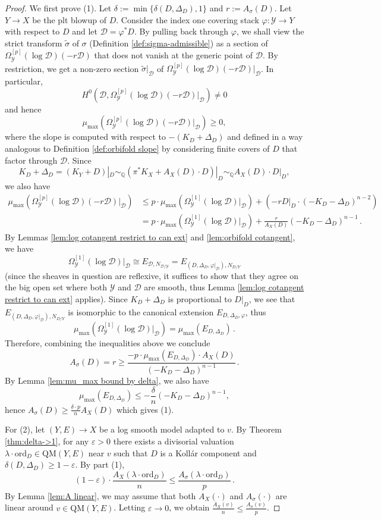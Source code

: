 \documentclass[12pt]{amsart}
\theoremstyle{definition}
\newcommand{\bQ}{\mathbb{Q}}
\newcommand{\cY}{\mathcal{Y}}
\newcommand{\cD}{\mathcal{D}}
\newcommand{\ord}{\mathrm{ord}}
\newcommand{\QM}{\mathrm{QM}}
\numberwithin{equation}{section}
\begin{document}
\begin{proof}
We first prove (1). Let $\delta := \min\{\delta(D,\Delta_D),1\}$ and $r := A_\sigma(D)$. Let $Y\to X$ be the plt blowup of $D$. Consider the index one covering stack $\varphi\colon \cY\to Y$ with respect to $D$ and let $\cD=\varphi^*D$. By pulling back through $\varphi$, we shall view the strict transform $\tilde{\sigma}$ of $\sigma$ (Definition \ref{def:sigma-admissible}) as a section of $\Omega_{\cY}^{[p]}(\log \cD)(-r\cD)$ that does not vanish at the generic point of $\cD$. By restriction, we get a non-zero section $\tilde{\sigma}|_{\cD}$ of $\Omega_{\cY}^{[p]}(\log \cD)(-r\cD)|_{\cD}$. In particular,
\[
H^0(\cD,\Omega_{\cY}^{[p]}(\log \cD)(-r\cD)|_{\cD}) \neq 0
\]
and hence
\[
\mu_{\max}(\Omega^{[p]}_{\cY}(\log \cD)(-r\cD)|_{\cD}) \ge 0,
\]
where the slope is computed with respect to $-(K_D+\Delta_D)$ and defined in a way analogous to Definition \ref{def:orbifold slope} by considering finite covers of $D$ that factor through $\cD$. Since
\[
K_D+\Delta_D = (K_Y+D)|_D\sim_\bQ (\pi^*K_X + A_{X}(D)\cdot D)|_D\sim_\bQ A_{X}(D)\cdot D|_D,
\]
we also have
\begin{align*}
\mu_{\max}(\Omega^{[p]}_{\cY}(\log \cD)(-r\cD)|_{\cD}) & \le p\cdot \mu_{\max}(\Omega^{[1]}_{\cY}(\log \cD)|_{\cD})+ (-rD|_D\cdot (-K_D-\Delta_D)^{n-2}) \\
& = p\cdot \mu_{\max}(\Omega^{[1]}_{\cY}(\log \cD)|_{\cD})+\frac{r}{A_{X}(D)}(-K_D-\Delta_D)^{n-1}\,.
\end{align*}
By Lemmas \ref{lem:log cotangent restrict to can ext} and \ref{lem:orbifold cotangent}, we have 
\[
\Omega_{\cY}^{[1]}(\log \cD)|_{\cD} \cong E_{\cD,N_{\cD/\cY}}= E_{(D,\Delta_D,\varphi|_{\cD}),N_{D/Y}}
\]
(since the sheaves in question are reflexive, it suffices to show that they agree on the big open set where both $\cY$ and $\cD$ are smooth, thus Lemma \ref{lem:log cotangent restrict to can ext} applies). Since $K_D+\Delta_D$ is proportional to $D|_D$, we see that $E_{(D,\Delta_D,\varphi|_{\cD}),N_{D/Y}}$ is isomorphic to the canonical extension $E_{D,\Delta_D,\varphi}$, thus
 \[
 \mu_{\max}(\Omega^{[1]}_{\cY}(\log \cD)|_{\cD})=\mu_{\max} (E_{D,\Delta_D}) \, .
 \]
Therefore, combining the inequalities above we conclude 
 \[
A_{\sigma}(D)= r\ge \frac{-p\cdot \mu_{\max}(E_{D,\Delta_D}) \cdot A_{X}(D)}{(-K_D-\Delta_D)^{n-1}} \, .
\]
By Lemma \ref{lem:mu_max bound by delta}, we also have
\[
\mu_{\max}(E_{D,\Delta_D})\le -\frac{\delta}n(-K_D-\Delta_D)^{n-1},
\]
hence $A_{\sigma}(D)\ge \frac{\delta \cdot p}{n} A_X(D)$ which gives (1). 

For (2), let $(Y,E)\to X$ be a log smooth model adapted to $v$. By Theorem \ref{thm:delta->1}, for any $\varepsilon > 0$ there exists a divisorial valuation $\lambda \cdot \ord_D \in \QM(Y,E)$ near $v$ such that $D$ is a Koll\'ar component and $\delta(D,\Delta_D) \ge 1 - \varepsilon$. By part (1),
\[
(1-\varepsilon) \cdot \frac{A_X(\lambda\cdot \ord_D)}{n} \le \frac{A_\sigma(\lambda\cdot \ord_D)}{p}\, .
\]
By Lemma \ref{lem:A linear}, we may assume that both $A_X(\cdot)$ and $A_\sigma(\cdot)$ are linear around  $v\in \QM(Y,E)$. Letting $\varepsilon \to 0$, we obtain $\frac{A_X(v)}{n}\le \frac{A_{\sigma}(v)}{p}$.
\end{proof}
\end{document}
